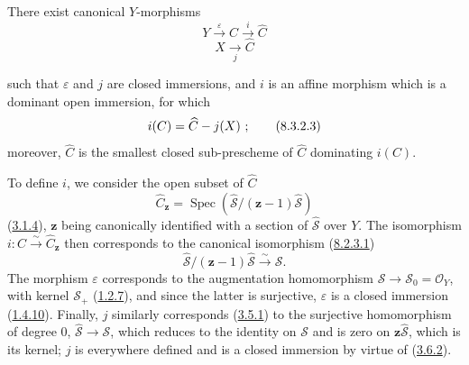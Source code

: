 \begin{proposition}[8.3.2]
\label{II.8.3.2}
There exist canonical $Y$-morphisms
\begin{equation}
\label{II.8.3.2.1}
  Y\xrightarrow{\varepsilon}C\xrightarrow{i}\widehat{C}
\tag{8.3.2.1}
\end{equation}
\begin{equation}
\label{II.8.3.2.2}
  X\xrightarrow[j]{}\widehat{C}
\tag{8.3.2.2}
\end{equation}

such that $\varepsilon$ and $j$ are closed immersions, and $i$ is an affine
morphism which is a dominant open immersion, for which
\begin{equation}
\label{II.8.3.2.3}
  i(C)=\widehat{C}- j(X)~;
\tag{8.3.2.3}
\end{equation}
moreover, $\widehat{C}$ is the smallest closed sub-prescheme of $\widehat{C}$
dominating $i(C)$.
\end{proposition}

To define $i$, we consider the open subset of $\widehat{C}$
\begin{equation}
\label{II.8.3.2.4}
  \widehat{C}_{\mathbf{z}}=
  \operatorname{Spec}(\widehat{\mathcal{S}}/(\mathbf{z}-1)\widehat{\mathcal{S}})
\tag{8.3.2.4}
\end{equation}
(\hyperref[II.3.1.4]{3.1.4}), $\mathbf{z}$ being canonically identified with a
section of $\widehat{\mathcal{S}}$ over $Y$. The isomorphism
$i:C\xrightarrow{\sim}\widehat{C}_{\mathbf{z}}$ then corresponds to the canonical
isomorphism (\hyperref[II.8.2.3.1]{8.2.3.1})
\[
  \widehat{\mathcal{S}}/(\mathbf{z}-1)\widehat{\mathcal{S}}
  \xrightarrow{\sim}\mathcal{S}.
\]
The morphism $\varepsilon$ corresponds to the augmentation homomorphism
$\mathcal{S}\to\mathcal{S}_0=\mathcal{O}_Y$, with kernel
$\mathcal{S}_+$ (\hyperref[II.1.2.7]{1.2.7}), and since the latter is
surjective, $\varepsilon$ is a closed immersion
(\hyperref[II.1.4.10]{1.4.10}). Finally, $j$ similarly corresponds
(\hyperref[II.3.5.1]{3.5.1}) to the surjective homomorphism of degree $0$,
$\widehat{\mathcal{S}}\to\mathcal{S}$, which reduces to the identity on
$\mathcal{S}$ and is zero on $\mathbf{z}\widehat{\mathcal{S}}$, which is its kernel;
$j$ is everywhere defined and is a closed immersion by virtue of
(\hyperref[II.3.6.2]{3.6.2}).

